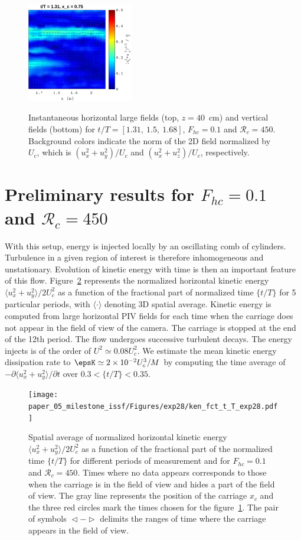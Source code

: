 \begin{figure}[htb]
{\includegraphics[width=4.63cm]{paper_05_milestone_issf/Figures/exp21/vv_400.pdf}
}
\vspace{-2mm}
\caption{Instantaneous horizontal large fields (top, $z=40$~cm) and vertical
fields (bottom) for $t/T = [1.31,~1.5,~1.68]$, $F_{hc} = 0.1$ and
$\mathcal{R}_c=450$. Background colors indicate the norm of the 2D field
normalized by $U_c$, which is $(u_x^2 + u_y^2)/U_c$ and $(u_x^2 + u_z^2)/U_c$,
respectively.}
\label{fig:field}
\end{figure}


\section{Preliminary results for $F_{hc} = 0.1$ and $\mathcal{R}_c=450$}

With this setup, energy is injected locally by an oscillating comb of
cylinders. Turbulence in a given region of interest is therefore inhomogeneous
and unstationary. Evolution of kinetic energy with time is then an important
feature of this flow. Figure~\ref{fig:ken} represents the normalized horizontal
kinetic energy $\langle u_x^2 + u_y^2 \rangle/2U_c^2$ as a function of the
fractional part of normalized time $\{t/T\}$ for 5 particular periods, with
$\langle\cdot\rangle$ denoting 3D spatial average. Kinetic energy is computed
from large horizontal PIV fields for each time when the carriage does not
appear in the field of view of the camera. The carriage is stopped at the end
of the 12th period. The flow undergoes successive turbulent decays. The energy
injects is of the order of $U^2 \simeq 0.08 U_c^2$.
%
We estimate the mean kinetic energy dissipation rate to
$\epsK \simeq 2 \times 10^{-2} U_c^3/M$ by computing the time average of
$-\partial\langle u_x^2+u_y^2\rangle/\partial t$ over $0.3 < \{t/T\} < 0.35$.


\begin{figure}[htb]
\centerline{
\texttt{[image: paper\_05\_milestone\_issf/Figures/exp28/ken\_fct\_t\_T\_exp28.pdf]}}
\vspace{-2mm}
\caption{Spatial average of normalized horizontal kinetic energy
$\langle u_x^2 + u_y^2\rangle/2U_c^2$ as a function of the fractional part of
the normalized time $\{t/T\}$ for different periods of measurement and for
$F_{hc} = 0.1$ and $\mathcal{R}_c=450$. Times where no data appears corresponds
to those when the carriage is in the field of view and hides a part of the
field of view. The gray line represents the position of the carriage $x_c$ and
the three red circles mark the times chosen for the figure~\ref{fig:field}. The
pair of symbols $\vartriangleleft-\vartriangleright$ delimits the ranges of
time where the carriage appears in the field of view.}
\label{fig:ken}
\end{figure}

